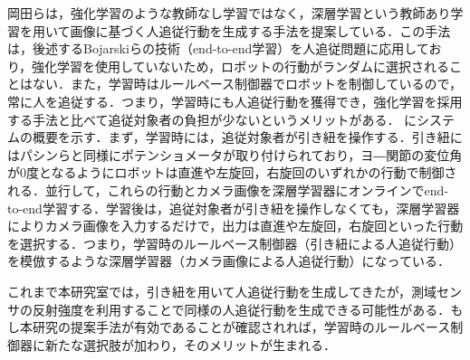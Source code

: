  岡田ら\cite{okada}は，強化学習のような教師なし学習ではなく，深層学習\cite{yann2}という教師あり学習を用いて画像に基づく人追従行動を生成する手法を提案している．この手法は，後述するBojarskiら\cite{bojarski}の技術（end-to-end学習）を人追従問題に応用しており，強化学習を使用していないため，ロボットの行動がランダムに選択されることはない．また，学習時はルールベース制御器でロボットを制御しているので，常に人を追従する．つまり，学習時にも人追従行動を獲得でき，強化学習を採用する手法と比べて追従対象者の負担が少ないというメリットがある．
  にシステムの概要を示す．まず，学習時には，追従対象者が引き紐を操作する．引き紐にはパシンらと同様にポテンショメータが取り付けられており，ヨ―関節の変位角が0度となるようにロボットは直進や左旋回，右旋回のいずれかの行動で制御される．並行して，これらの行動とカメラ画像を深層学習器にオンラインでend-to-end学習する．学習後は，追従対象者が引き紐を操作しなくても，深層学習器によりカメラ画像を入力するだけで，出力は直進や左旋回，右旋回といった行動を選択する．つまり，学習時のルールベース制御器（引き紐による人追従行動）を模倣するような深層学習器（カメラ画像による人追従行動）になっている．

  これまで本研究室では，引き紐を用いて人追従行動を生成してきたが，測域センサの反射強度を利用することで同様の人追従行動を生成できる可能性がある．もし本研究の提案手法が有効であることが確認されれば，学習時のルールベース制御器に新たな選択肢が加わり，そのメリットが生まれる．

\newpage

